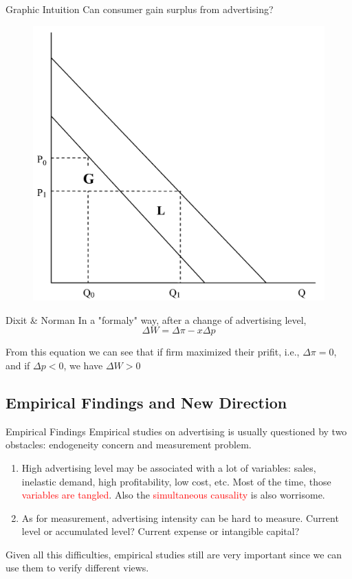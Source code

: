 \documentclass[10pt]{beamer}
\begin{document}
\begin{frame}{Graphic Intuition}
Can consumer gain surplus from advertising?
\begin{figure}
    \centering
    \includegraphics[width = .7\textwidth]{dixit2.png}
\end{figure}
\end{frame}

\begin{frame}{Dixit \& Norman}
    In a "formaly" way, after a change of advertising level, 
    \begin{equation}
        \Delta W = \Delta \pi - x \Delta p
    \end{equation}

    From this equation we can see that if firm maximized their prifit, i.e., $\Delta \pi = 0$, and if $\Delta p < 0$, we have $\Delta W > 0$
\end{frame}

\subsection{Empirical Findings and New Direction}
\begin{frame}{Empirical Findings}
Empirical studies on advertising is usually questioned by two obstacles: endogeneity concern and measurement problem.
\begin{enumerate}
    \item High advertising level may be associated with a lot of variables: sales, inelastic demand, high profitability, low cost, etc. Most of the time, those \textcolor{red}{variables are tangled}. Also the \textcolor{red}{simultaneous causality} is also worrisome.
    
    \item As for measurement, advertising intensity can be hard to measure. Current level or accumulated level? Current expense or intangible capital?
\end{enumerate}

Given all this difficulties, empirical studies still are very important since we can use them to verify different views.
\end{frame}
\end{document}
